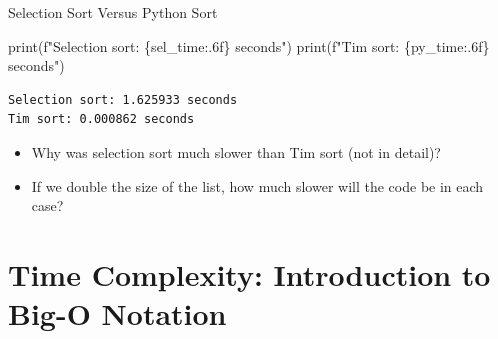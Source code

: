 \documentclass[
  ignorenonframetext,
]{beamer}
\newenvironment{Shaded}{\begin{snugshade}}{\end{snugshade}}
\newcommand{\BuiltInTok}[1]{\textcolor[rgb]{0.00,0.23,0.31}{#1}}
\newcommand{\NormalTok}[1]{\textcolor[rgb]{0.00,0.23,0.31}{#1}}
\newcommand{\SpecialCharTok}[1]{\textcolor[rgb]{0.37,0.37,0.37}{#1}}
\newcommand{\SpecialStringTok}[1]{\textcolor[rgb]{0.13,0.47,0.30}{#1}}
\begin{document}
\begin{frame}[fragile]{Selection Sort Versus Python Sort}
\protect\hypertarget{selection-sort-versus-python-sort-2}{}
\begin{Shaded}
\begin{Highlighting}[]
\BuiltInTok{print}\NormalTok{(}\SpecialStringTok{f"Selection sort: }\SpecialCharTok{\{}\NormalTok{sel\_time}\SpecialCharTok{:.6f\}}\SpecialStringTok{ seconds"}\NormalTok{)}
\BuiltInTok{print}\NormalTok{(}\SpecialStringTok{f"Tim sort: }\SpecialCharTok{\{}\NormalTok{py\_time}\SpecialCharTok{:.6f\}}\SpecialStringTok{ seconds"}\NormalTok{)}
\end{Highlighting}
\end{Shaded}

\begin{verbatim}
Selection sort: 1.625933 seconds
Tim sort: 0.000862 seconds
\end{verbatim}

\begin{itemize}
\item
  Why was selection sort much slower than Tim sort (not in detail)?
\item
  If we double the size of the list, how much slower will the code be in
  each case?
\end{itemize}
\end{frame}

\hypertarget{time-complexity-introduction-to-big-o-notation}{%
\section{Time Complexity: Introduction to Big-O
Notation}\label{time-complexity-introduction-to-big-o-notation}}
\end{document}
